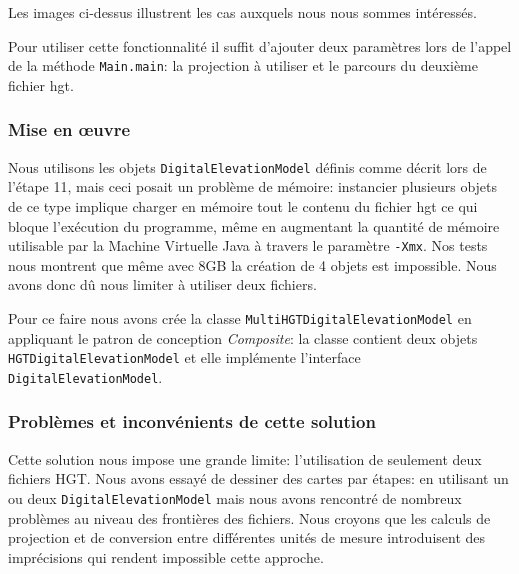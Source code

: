 \documentclass[11pt,a4paper]{article}
\begin{document}
Les images ci-dessus illustrent les cas auxquels nous nous sommes intéressés.

Pour utiliser cette fonctionnalité il suffit d'ajouter deux paramètres lors de l'appel de la méthode \texttt{Main.main}: la projection à utiliser et le parcours du deuxième fichier hgt.

\subsubsection*{Mise en œuvre}
Nous utilisons les objets \texttt{DigitalElevationModel} définis comme décrit lors de l'étape 11, mais ceci posait un problème de mémoire: instancier plusieurs objets de ce type implique charger en mémoire tout le contenu du fichier hgt ce qui bloque l'exécution du programme, même en augmentant la quantité de mémoire utilisable par la Machine Virtuelle Java à travers le paramètre \texttt{-Xmx}. Nos tests nous montrent que même avec 8GB la création de 4 objets est impossible. Nous avons donc dû nous limiter à utiliser deux fichiers.

Pour ce faire nous avons crée la classe \texttt{MultiHGTDigitalElevationModel} en appliquant le patron de conception \textit{Composite}: la classe contient deux objets \texttt{HGTDigitalElevationModel} et elle implémente l'interface \texttt{DigitalElevationModel}.

\subsubsection*{Problèmes et inconvénients de cette solution}
Cette solution nous impose une grande limite: l'utilisation de seulement deux fichiers HGT. Nous avons essayé de dessiner des cartes par étapes: en utilisant un ou deux \texttt{DigitalElevationModel} mais nous avons rencontré de nombreux problèmes au niveau des frontières des fichiers.
Nous croyons que les calculs de projection et de conversion entre différentes unités de mesure introduisent des imprécisions qui rendent impossible cette approche.

\end{document}
